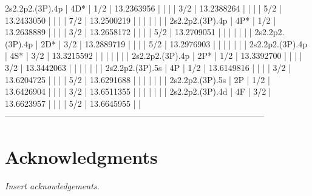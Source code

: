 \documentclass[12pt]{article}
\newcommand*{\restrictlinewidthbox}[1]{%
  \begingroup
    \sbox0{#1}%
    \ifdim\wd0>\linewidth
      \resizebox{\linewidth}{!}{\copy0}%
    \else
      \copy0 %
    \fi
  \endgroup
}
\begin{document}
\begin{table}
\begin{verbbox}
2s2.2p2.(3P).4p    | 4D*    |  1/2 |          13.2363956   |                    |          
                   |        |  3/2 |          13.2388264   |                    |          
                   |        |  5/2 |          13.2433050   |                    |          
                   |        |  7/2 |          13.2500219   |                    |          
                   |        |      |                       |                    |           
2s2.2p2.(3P).4p    | 4P*    |  1/2 |          13.2638889   |                    |          
                   |        |  3/2 |          13.2658172   |                    |          
                   |        |  5/2 |          13.2709051   |                    |          
                   |        |      |                       |                    |           
2s2.2p2.(3P).4p    | 2D*    |  3/2 |          13.2889719   |                    |          
                   |        |  5/2 |          13.2976903   |                    |          
                   |        |      |                       |                    |           
2s2.2p2.(3P).4p    | 4S*    |  3/2 |          13.3215592   |                    |          
                   |        |      |                       |                    |           
2s2.2p2.(3P).4p    | 2P*    |  1/2 |          13.3392700   |                    |          
                   |        |  3/2 |          13.3442063   |                    |          
                   |        |      |                       |                    |           
2s2.2p2.(3P).5s    | 4P     |  1/2 |          13.6149816   |                    |          
                   |        |  3/2 |          13.6204725   |                    |          
                   |        |  5/2 |          13.6291688   |                    |          
                   |        |      |                       |                    |           
2s2.2p2.(3P).5s    | 2P     |  1/2 |          13.6426904   |                    |          
                   |        |  3/2 |          13.6511355   |                    |          
                   |        |      |                       |                    |           
2s2.2p2.(3P).4d    | 4F     |  3/2 |          13.6623957   |                    |          
                   |        |  5/2 |          13.6645955   |                    |          
--------------------------------------------------------------------------------------------
\end{verbbox}
\restrictlinewidthbox{\theverbbox}
\end{table}
\clearpage

\section{Acknowledgments}
\textit{Insert acknowledgements.}

{}

\end{document}
